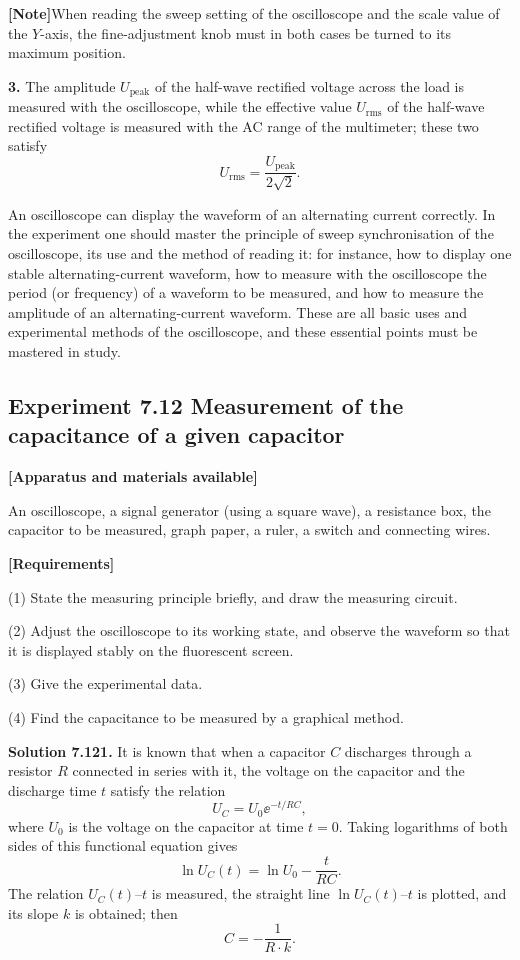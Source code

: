 \textbf{[Note]}\quad When reading the sweep setting of the oscilloscope and the scale value of the $Y$-axis, the fine-adjustment knob must in both cases be turned to its maximum position.

\textbf{3.} The amplitude $U_{\text{peak}}$ of the half-wave rectified voltage across the load is measured with the oscilloscope, while the effective value $U_{\text{rms}}$ of the half-wave rectified voltage is measured with the AC range of the multimeter; these two satisfy
\[
U_{\text{rms}}=\frac{U_{\text{peak}}}{2\sqrt{2}}.
\]

\begin{commentary}
An oscilloscope can display the waveform of an alternating current correctly. In the experiment one should master the principle of sweep synchronisation of the oscilloscope, its use and the method of reading it: for instance, how to display one stable alternating-current waveform, how to measure with the oscilloscope the period (or frequency) of a waveform to be measured, and how to measure the amplitude of an alternating-current waveform. These are all basic uses and experimental methods of the oscilloscope, and these essential points must be mastered in study.
\end{commentary}

\subsection*{Experiment 7.12 \quad Measurement of the capacitance of a given capacitor}

\textbf{[Apparatus and materials available]}

An oscilloscope, a signal generator (using a square wave), a resistance box, the capacitor to be measured, graph paper, a ruler, a switch and connecting wires.

\textbf{[Requirements]}

(1) State the measuring principle briefly, and draw the measuring circuit.

(2) Adjust the oscilloscope to its working state, and observe the waveform so that it is displayed stably on the fluorescent screen.

(3) Give the experimental data.

(4) Find the capacitance to be measured by a graphical method.

\textbf{Solution 7.12}\quad \textbf{1.} It is known that when a capacitor $C$ discharges through a resistor $R$ connected in series with it, the voltage on the capacitor and the discharge time $t$ satisfy the relation
\[
U_C=U_0\ee^{-t/RC},
\]
where $U_0$ is the voltage on the capacitor at time $t=0$. Taking logarithms of both sides of this functional equation gives
\[
\ln U_C(t)=\ln U_0-\frac{t}{RC}.
\]
The relation $U_C(t)$--$t$ is measured, the straight line $\ln U_C(t)$--$t$ is plotted, and its slope $k$ is obtained; then
\[
C=-\frac{1}{R\cdot k}.
\]

